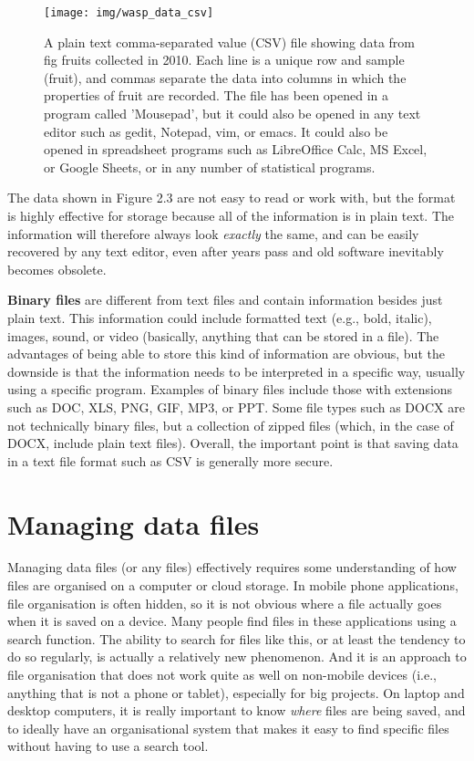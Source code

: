 \documentclass[
  openany]{krantz}
\begin{document}
\begin{figure}
\texttt{[image: img/wasp\_data\_csv]} \caption{A plain text comma-separated value (CSV) file showing data from fig fruits collected in 2010. Each line is a unique row and sample (fruit), and commas separate the data into columns in which the properties of fruit are recorded. The file has been opened in a program called 'Mousepad', but it could also be opened in any text editor such as gedit, Notepad, vim, or emacs. It could also be opened in spreadsheet programs such as LibreOffice Calc, MS Excel, or Google Sheets, or in any number of statistical programs.}\label{fig:unnamed-chunk-5}
\end{figure}

The data shown in Figure 2.3 are not easy to read or work with, but the format is highly effective for storage because all of the information is in plain text.
The information will therefore always look \emph{exactly} the same, and can be easily recovered by any text editor, even after years pass and old software inevitably becomes obsolete.

\textbf{Binary files} are different from text files and contain information besides just plain text.
This information could include formatted text (e.g., bold, italic), images, sound, or video (basically, anything that can be stored in a file).
The advantages of being able to store this kind of information are obvious, but the downside is that the information needs to be interpreted in a specific way, usually using a specific program.
Examples of binary files include those with extensions such as DOC, XLS, PNG, GIF, MP3, or PPT.
Some file types such as DOCX are not technically binary files, but a collection of zipped files (which, in the case of DOCX, include plain text files).
Overall, the important point is that saving data in a text file format such as CSV is generally more secure.

\hypertarget{managing-data-files}{%
\section{Managing data files}\label{managing-data-files}}

Managing data files (or any files) effectively requires some understanding of how files are organised on a computer or cloud storage.
In mobile phone applications, file organisation is often hidden, so it is not obvious where a file actually goes when it is saved on a device.
Many people find files in these applications using a search function.
The ability to search for files like this, or at least the tendency to do so regularly, is actually a relatively new phenomenon.
And it is an approach to file organisation that does not work quite as well on non-mobile devices (i.e., anything that is not a phone or tablet), especially for big projects.
On laptop and desktop computers, it is really important to know \emph{where} files are being saved, and to ideally have an organisational system that makes it easy to find specific files without having to use a search tool.
\end{document}

